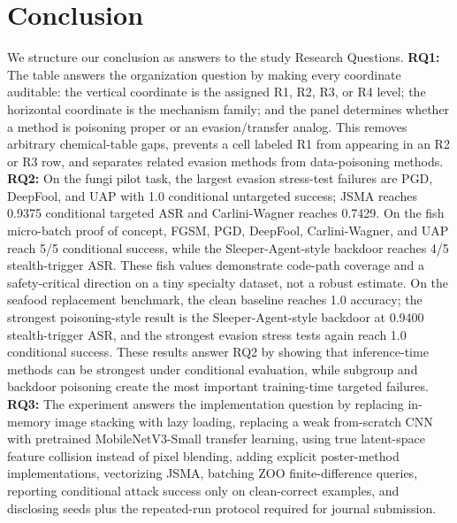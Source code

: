 \documentclass[conference]{IEEEtran}
\begin{document}
\section{Conclusion}
We structure our conclusion as answers to the study Research Questions.
\textbf{RQ1:} The table answers the organization question by making every coordinate auditable: the vertical coordinate is the assigned R1, R2, R3, or R4 level; the horizontal coordinate is the mechanism family; and the panel determines whether a method is poisoning proper or an evasion/transfer analog. This removes arbitrary chemical-table gaps, prevents a cell labeled R1 from appearing in an R2 or R3 row, and separates related evasion methods from data-poisoning methods.
\textbf{RQ2:} On the fungi pilot task, the largest evasion stress-test failures are PGD, DeepFool, and UAP with 1.0 conditional untargeted success; JSMA reaches 0.9375 conditional targeted ASR and Carlini-Wagner reaches 0.7429. On the fish micro-batch proof of concept, FGSM, PGD, DeepFool, Carlini-Wagner, and UAP reach 5/5 conditional success, while the Sleeper-Agent-style backdoor reaches 4/5 stealth-trigger ASR. These fish values demonstrate code-path coverage and a safety-critical direction on a tiny specialty dataset, not a robust estimate. On the seafood replacement benchmark, the clean baseline reaches 1.0 accuracy; the strongest poisoning-style result is the Sleeper-Agent-style backdoor at 0.9400 stealth-trigger ASR, and the strongest evasion stress tests again reach 1.0 conditional success. These results answer RQ2 by showing that inference-time methods can be strongest under conditional evaluation, while subgroup and backdoor poisoning create the most important training-time targeted failures.
\textbf{RQ3:} The experiment answers the implementation question by replacing in-memory image stacking with lazy loading, replacing a weak from-scratch CNN with pretrained MobileNetV3-Small transfer learning, using true latent-space feature collision instead of pixel blending, adding explicit poster-method implementations, vectorizing JSMA, batching ZOO finite-difference queries, reporting conditional attack success only on clean-correct examples, and disclosing seeds plus the repeated-run protocol required for journal submission.

\end{document}
